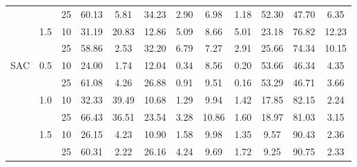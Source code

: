 \documentclass[manuscript,screen,review]{acmart}
\begin{document}
\begin{table}[h]
{\begin{tabular}{cccccccccccc}
    &     & 25 &  60.13 &   5.81 &   34.23 &  2.90 &           6.98 &  1.18 &    52.30 &    47.70 &   6.35 \\
    & 1.5 & 10 &  31.19 &  20.83 &   12.86 &  5.09 &           8.66 &  5.01 &    23.18 &    76.82 &  12.23 \\
    &     & 25 &  58.86 &   2.53 &   32.20 &  6.79 &           7.27 &  2.91 &    25.66 &    74.34 &  10.15 \\
SAC & 0.5 & 10 &  24.00 &   1.74 &   12.04 &  0.34 &           8.56 &  0.20 &    53.66 &    46.34 &   4.35 \\
    &     & 25 &  61.08 &   4.26 &   26.88 &  0.91 &           9.51 &  0.16 &    53.29 &    46.71 &   3.66 \\
    & 1.0 & 10 &  32.33 &  39.49 &   10.68 &  1.29 &           9.94 &  1.42 &    17.85 &    82.15 &   2.24 \\
    &     & 25 &  66.43 &  36.51 &   23.54 &  3.28 &          10.86 &  1.60 &    18.97 &    81.03 &   3.15 \\
    & 1.5 & 10 &  26.15 &   4.23 &   10.90 &  1.58 &           9.98 &  1.35 &     9.57 &    90.43 &   2.36 \\
    &     & 25 &  60.31 &   2.22 &   26.16 &  4.24 &           9.69 &  1.72 &     9.25 &    90.75 &   2.33 \\
\end{tabular}}
\label{tab:additional}
\end{table}%

\end{document}
